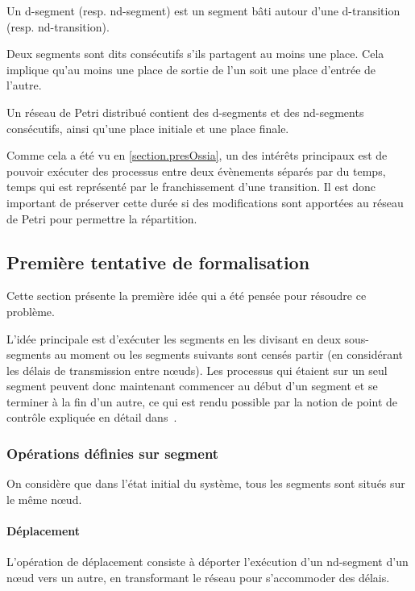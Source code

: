 \begin{mydef}[d-segment]
Un d-segment (resp. nd-segment) est un segment bâti autour d'une d-transition (resp. nd-transition).
\end{mydef}

\begin{mydef}
Deux segments sont dits consécutifs s'ils partagent au moins une place. Cela implique qu'au moins une place de sortie de l'un soit une place d'entrée de l'autre.
\end{mydef}

Un réseau de Petri distribué contient des d-segments et des nd-segments consécutifs, ainsi qu'une place initiale et une place finale.

Comme cela a été vu en \cref{section.presOssia}, un des intérêts principaux est de pouvoir exécuter des processus entre deux évènements séparés par du temps, temps qui est représenté par le franchissement d'une transition. Il est donc important de préserver cette durée si des modifications sont apportées au réseau de Petri pour permettre la répartition.

\subsection{Première tentative de formalisation}
Cette section présente la première idée qui a été pensée pour résoudre ce problème.

L'idée principale est d'exécuter les segments en les divisant en deux sous-segments au moment ou les segments suivants sont censés partir (en considérant les délais de transmission entre nœuds). Les processus qui étaient sur un seul segment peuvent donc maintenant commencer au début d'un segment et se terminer à la fin d'un autre, ce qui est rendu possible par la notion de point de contrôle expliquée en détail dans~\cite[p. 73]{allombert2009aspects}.
 
\subsubsection{Opérations définies sur segment}
On considère que dans l'état initial du système, tous les segments sont situés sur le même nœud.

\paragraph{Déplacement}
L'opération de déplacement consiste à déporter l'exécution d'un nd-segment d'un nœud vers un autre, en transformant le réseau pour s'accommoder des délais.

